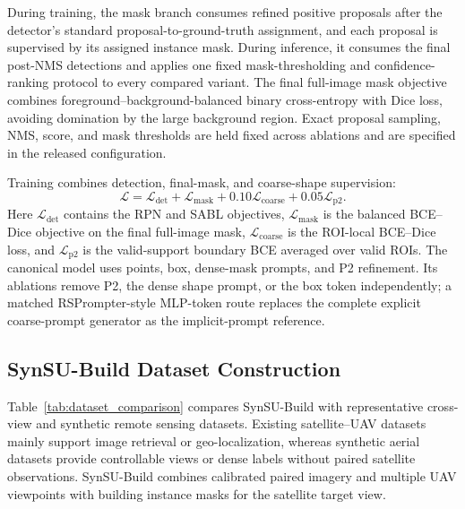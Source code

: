 \documentclass[letterpaper,journal]{IEEEtran}
\begin{document}
During training, the mask branch consumes refined positive proposals after the detector's standard proposal-to-ground-truth assignment, and each proposal is supervised by its assigned instance mask. During inference, it consumes the final post-NMS detections and applies one fixed mask-thresholding and confidence-ranking protocol to every compared variant. The final full-image mask objective combines foreground--background-balanced binary cross-entropy with Dice loss, avoiding domination by the large background region. Exact proposal sampling, NMS, score, and mask thresholds are held fixed across ablations and are specified in the released configuration.

Training combines detection, final-mask, and coarse-shape supervision:
\begin{equation}
\mathcal{L}=\mathcal{L}_{\mathrm{det}}
+\mathcal{L}_{\mathrm{mask}}
+0.10\mathcal{L}_{\mathrm{coarse}}
+0.05\mathcal{L}_{\mathrm{p2}}.
\label{eq:single_loss}
\end{equation}
Here $\mathcal{L}_{\mathrm{det}}$ contains the RPN and SABL objectives, $\mathcal{L}_{\mathrm{mask}}$ is the balanced BCE--Dice objective on the final full-image mask, $\mathcal{L}_{\mathrm{coarse}}$ is the ROI-local BCE--Dice loss, and $\mathcal{L}_{\mathrm{p2}}$ is the valid-support boundary BCE averaged over valid ROIs. The canonical model uses points, box, dense-mask prompts, and P2 refinement. Its ablations remove P2, the dense shape prompt, or the box token independently; a matched RSPrompter-style MLP-token route replaces the complete explicit coarse-prompt generator as the implicit-prompt reference.

\subsection{SynSU-Build Dataset Construction}
\label{sec:dataset}

Table~\ref{tab:dataset_comparison} compares SynSU-Build with representative cross-view and synthetic remote sensing datasets. Existing satellite--UAV datasets mainly support image retrieval or geo-localization, whereas synthetic aerial datasets provide controllable views or dense labels without paired satellite observations. SynSU-Build combines calibrated paired imagery and multiple UAV viewpoints with building instance masks for the satellite target view.
\end{document}

